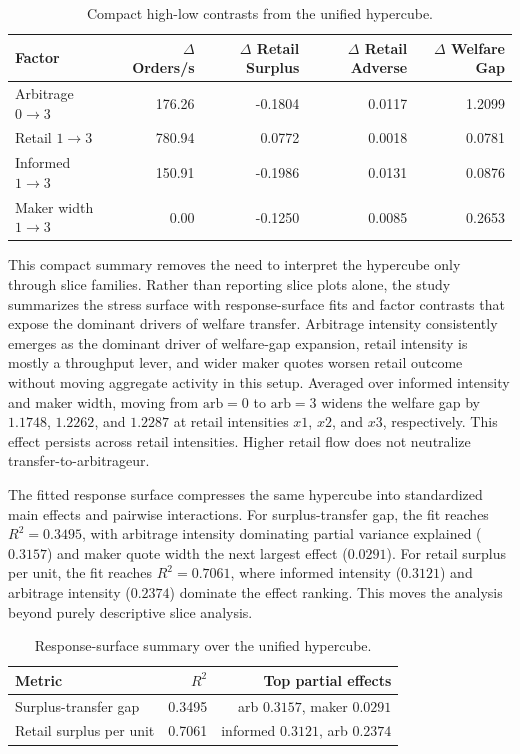 \documentclass[11pt]{article}
\begin{document}
\begin{table}[t]
\centering
\begin{tabular}{lrrrr}
\toprule
Factor & $\Delta$ Orders/s & $\Delta$ Retail Surplus & $\Delta$ Retail Adverse & $\Delta$ Welfare Gap \\
\midrule
Arbitrage $0 \rightarrow 3$ & 176.26 & -0.1804 & 0.0117 & 1.2099 \\
Retail $1 \rightarrow 3$ & 780.94 & 0.0772 & 0.0018 & 0.0781 \\
Informed $1 \rightarrow 3$ & 150.91 & -0.1986 & 0.0131 & 0.0876 \\
Maker width $1 \rightarrow 3$ & 0.00 & -0.1250 & 0.0085 & 0.2653 \\
\bottomrule
\end{tabular}
\caption{Compact high-low contrasts from the unified hypercube.}
\end{table}

This compact summary removes the need to interpret the hypercube only through slice families. Rather than reporting slice plots alone, the study summarizes the stress surface with response-surface fits and factor contrasts that expose the dominant drivers of welfare transfer. Arbitrage intensity consistently emerges as the dominant driver of welfare-gap expansion, retail intensity is mostly a throughput lever, and wider maker quotes worsen retail outcome without moving aggregate activity in this setup. Averaged over informed intensity and maker width, moving from $\text{arb}=0$ to $\text{arb}=3$ widens the welfare gap by $1.1748$, $1.2262$, and $1.2287$ at retail intensities $x1$, $x2$, and $x3$, respectively. This effect persists across retail intensities. Higher retail flow does not neutralize transfer-to-arbitrageur.

The fitted response surface compresses the same hypercube into standardized main effects and pairwise interactions. For surplus-transfer gap, the fit reaches $R^2 = 0.3495$, with arbitrage intensity dominating partial variance explained ($0.3157$) and maker quote width the next largest effect ($0.0291$). For retail surplus per unit, the fit reaches $R^2 = 0.7061$, where informed intensity ($0.3121$) and arbitrage intensity ($0.2374$) dominate the effect ranking. This moves the analysis beyond purely descriptive slice analysis.

\begin{table}[t]
\centering
\begin{tabular}{lrr}
\toprule
Metric & $R^2$ & Top partial effects \\
\midrule
Surplus-transfer gap & 0.3495 & arb $0.3157$, maker $0.0291$ \\
Retail surplus per unit & 0.7061 & informed $0.3121$, arb $0.2374$ \\
\bottomrule
\end{tabular}
\caption{Response-surface summary over the unified hypercube.}
\end{table}
\end{document}
